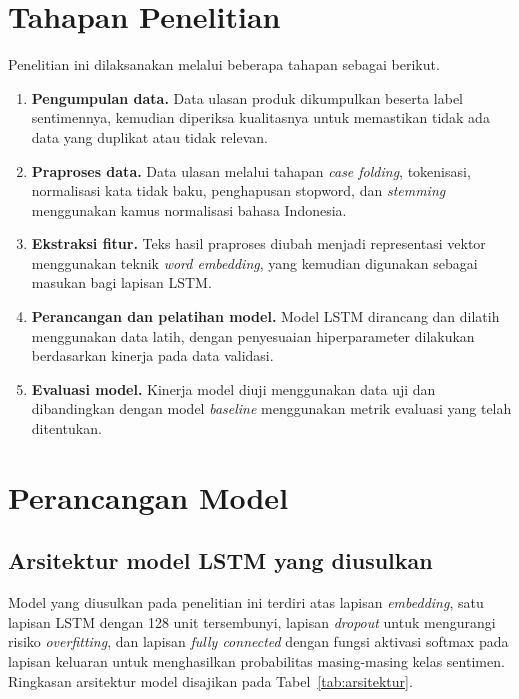 \section{Tahapan Penelitian}
Penelitian ini dilaksanakan melalui beberapa tahapan sebagai berikut.
\begin{enumerate}
  \item \textbf{Pengumpulan data.} Data ulasan produk dikumpulkan
        beserta label sentimennya, kemudian diperiksa kualitasnya
        untuk memastikan tidak ada data yang duplikat atau tidak
        relevan.
  \item \textbf{Praproses data.} Data ulasan melalui tahapan
        \textit{case folding}, tokenisasi, normalisasi kata tidak
        baku, penghapusan stopword, dan \textit{stemming}
        menggunakan kamus normalisasi bahasa Indonesia.
  \item \textbf{Ekstraksi fitur.} Teks hasil praproses diubah menjadi
        representasi vektor menggunakan teknik \textit{word
        embedding}, yang kemudian digunakan sebagai masukan bagi
        lapisan LSTM.
  \item \textbf{Perancangan dan pelatihan model.} Model LSTM
        dirancang dan dilatih menggunakan data latih, dengan
        penyesuaian hiperparameter dilakukan berdasarkan kinerja pada
        data validasi.
  \item \textbf{Evaluasi model.} Kinerja model diuji menggunakan data
        uji dan dibandingkan dengan model \textit{baseline}
        menggunakan metrik evaluasi yang telah ditentukan.
\end{enumerate}

\section{Perancangan Model}

\subsection{Arsitektur model LSTM yang diusulkan}
Model yang diusulkan pada penelitian ini terdiri atas lapisan
\textit{embedding}, satu lapisan LSTM dengan 128 unit tersembunyi,
lapisan \textit{dropout} untuk mengurangi risiko \textit{overfitting},
dan lapisan \textit{fully connected} dengan fungsi aktivasi softmax
pada lapisan keluaran untuk menghasilkan probabilitas masing-masing
kelas sentimen. Ringkasan arsitektur model disajikan pada
Tabel~\ref{tab:arsitektur}.

